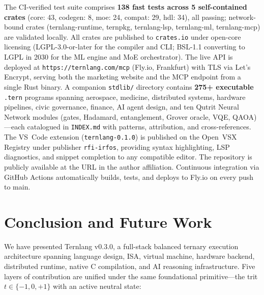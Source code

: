 \documentclass[journal,10pt,twocolumn]{IEEEtran}
\begin{document}
The CI-verified test suite comprises \textbf{138 fast tests across 5 self-contained crates}
(core: 43, codegen: 8, moe: 24, compat: 29, hdl: 34), all passing; network-bound crates
(ternlang-runtime, ternpkg, ternlang-lsp, ternlang-ml, ternlang-mcp) are validated locally.
All crates are published to \texttt{crates.io} under open-core licensing
(LGPL-3.0-or-later for the compiler and CLI; BSL-1.1 converting to LGPL in
2030 for the ML engine and MoE orchestrator). The live API is deployed at
\texttt{https://ternlang.com/mcp} (Fly.io, Frankfurt) with TLS via Let's Encrypt,
serving both the marketing website and the MCP endpoint from a single Rust
binary. A companion \texttt{stdlib/} directory contains \textbf{275+ executable}
\texttt{.tern} programs spanning aerospace, medicine, distributed systems,
hardware pipelines, civic governance, finance, AI agent design, and ten Qutrit
Neural Network modules (gates, Hadamard, entanglement, Grover oracle, VQE,
QAOA)—each catalogued in \texttt{INDEX.md} with patterns, attribution, and
cross-references. The VS~Code extension (\texttt{ternlang-0.1.0}) is published
on the Open~VSX Registry under publisher \texttt{rfi-irfos}, providing syntax
highlighting, LSP diagnostics, and snippet completion to any compatible editor.
The repository is publicly available at the URL in the author affiliation.
Continuous integration via GitHub Actions automatically builds, tests, and
deploys to Fly.io on every push to main.

\section{Conclusion and Future Work}
\label{sec:conclusion}

We have presented Ternlang v0.3.0, a full-stack balanced ternary execution
architecture spanning language design, ISA, virtual machine, hardware backend,
distributed runtime, native C compilation, and AI reasoning infrastructure. Five
layers of contribution are unified under the same foundational primitive—the
trit $t \in \{-1, 0, +1\}$ with an active neutral state:
\end{document}
